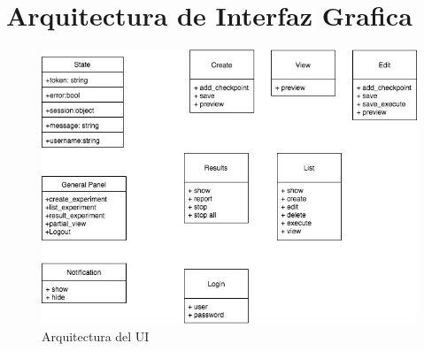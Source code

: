 \section{Arquitectura de Interfaz Grafica}
\begin{figure}[!htb]
    \includegraphics[width=\linewidth]{../figures/d21.jpg}
    \caption{Arquitectura del UI}
    \label{fig:d21}
\end{figure}
\newpage